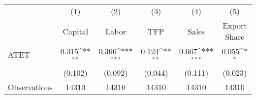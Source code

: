 {
\def\sym#1{\ifmmode^{#1}\else\(^{#1}\)\fi}
\begin{tabular}{l*{5}{c}}
\hline\hline
                    &\multicolumn{1}{c}{(1)}&\multicolumn{1}{c}{(2)}&\multicolumn{1}{c}{(3)}&\multicolumn{1}{c}{(4)}&\multicolumn{1}{c}{(5)}\\
                    &\multicolumn{1}{c}{Capital}&\multicolumn{1}{c}{Labor}&\multicolumn{1}{c}{TFP}&\multicolumn{1}{c}{Sales}&\multicolumn{1}{c}{Export Share}\\
\hline
ATET                &       0.315\sym{**} &       0.366\sym{***}&       0.124\sym{**} &       0.667\sym{***}&       0.055\sym{*}  \\
                    &     (0.102)         &     (0.092)         &     (0.044)         &     (0.111)         &     (0.023)         \\
\hline
Observations        &       14310         &       14310         &       14310         &       14310         &       14310         \\
\hline\hline
\end{tabular}
}
